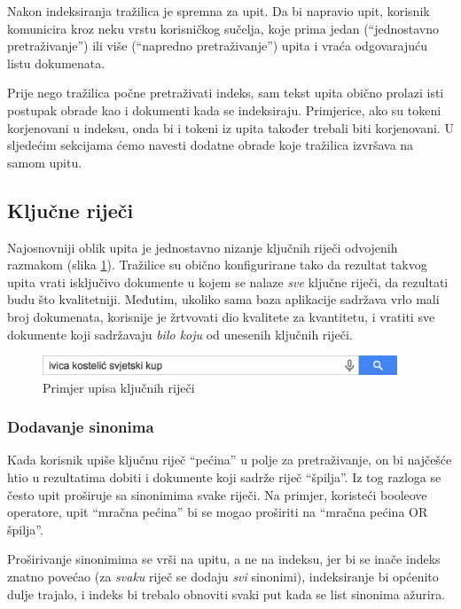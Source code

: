 \documentclass[a4paper,twoside,12pt]{scrreprt}
\begin{document}
Nakon indeksiranja tražilica je spremna za upit. Da bi napravio upit, korisnik komunicira kroz neku vrstu korisničkog sučelja, koje prima jedan (``jednostavno pretraživanje'') ili više (``napredno pretraživanje'') upita i vraća odgovarajuću listu dokumenata.

Prije nego tražilica počne pretraživati indeks, sam tekst upita obično prolazi isti postupak obrade kao i dokumenti kada se indeksiraju. Primjerice, ako su tokeni korjenovani u indeksu, onda bi i tokeni iz upita također trebali biti korjenovani. U sljedećim sekcijama ćemo navesti dodatne obrade koje tražilica izvršava na samom upitu.

\subsection{Ključne riječi}

Najosnovniji oblik upita je jednostavno nizanje ključnih riječi odvojenih razmakom (slika \ref{keywords}). Tražilice su obično konfigurirane tako da rezultat takvog upita vrati isključivo dokumente u kojem se nalaze \textit{sve} ključne riječi, da rezultati budu što kvalitetniji. Međutim, ukoliko sama baza aplikacije sadržava vrlo mali broj dokumenata, korisnije je žrtvovati dio kvalitete za kvantitetu, i vratiti sve dokumente koji sadržavaju \textit{bilo koju} od unesenih ključnih riječi.

\begin{figure}[H]
  \centering
  \includegraphics[width=300pt]{keywords}
  \caption{Primjer upisa ključnih riječi}
  \label{keywords}
\end{figure}

\subsubsection{Dodavanje sinonima}

Kada korisnik upiše ključnu riječ ``pećina'' u polje za pretraživanje, on bi najčešće htio u rezultatima dobiti i dokumente koji sadrže riječ ``špilja''. Iz tog razloga se često upit proširuje sa sinonimima svake riječi. Na primjer, koristeći booleove operatore, upit ``mračna pećina'' bi se mogao proširiti na ``mračna pećina OR špilja''.

Proširivanje sinonimima se vrši na upitu, a ne na indeksu, jer bi se inače indeks znatno povećao (za \textit{svaku} riječ se dodaju \textit{svi} sinonimi), indeksiranje bi općenito dulje trajalo, i indeks bi trebalo obnoviti svaki put kada se list sinonima ažurira.
\end{document}
